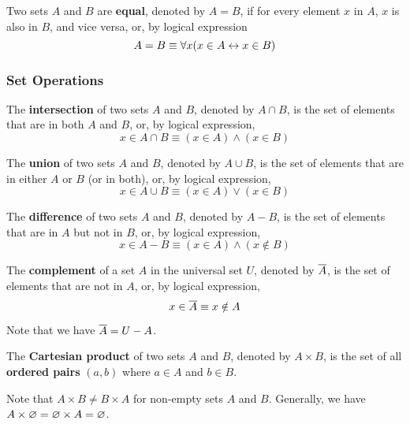 \begin{definition}
    Two sets $A$ and $B$ are \textbf{equal}, denoted by $A = B$, if for every element $x$ in $A$,
    $x$ is also in $B$, and vice versa, or, by logical expression
    \[
        A=B \equiv \forall x (x \in A \leftrightarrow x \in B)
    \]
\end{definition}

\subsubsection{Set Operations}

\begin{definition}
    The \textbf{intersection} of two sets $A$ and $B$, denoted by $A \cap B$,
    is the set of elements that are in both $A$ and $B$, or, by logical expression,
    \[
        x\in A\cap B \equiv (x \in A) \land (x \in B)
    \]
\end{definition}

\begin{definition}
    The \textbf{union} of two sets $A$ and $B$, denoted by $A \cup B$,
    is the set of elements that are in either $A$ or $B$ (or in both), or, by logical expression,
    \[
        x\in A\cup B \equiv (x \in A) \lor (x \in B)
    \]
\end{definition}

\begin{definition}[Difference $-$]
    The \textbf{difference} of two sets $A$ and $B$, denoted by $A - B$,
    is the set of elements that are in $A$ but not in $B$, or, by logical expression,
    \[
        x \in A - B \equiv (x \in A) \land (x \notin B)
    \]
\end{definition}

\begin{definition}
    The \textbf{complement} of a set $A$ in the universal set $U$, denoted by $\overline{A}$,
    is the set of elements that are not in $A$, or, by logical expression,
    \[
        x \in \overline{A} \equiv x \notin A
    \]
    
    Note that we have $\overline{A} = U - A$.
\end{definition}

\begin{definition}
    The \textbf{Cartesian product} of two sets $A$ and $B$, denoted by $A \times B$,
    is the set of all \textbf{ordered pairs} $(a, b)$ where $a \in A$ and $b \in B$.
\end{definition}

\begin{remark}
    Note that $A\times B\neq B\times A$ for non-empty sets $A$ and $B$.
    Generally, we have $A\times \varnothing = \varnothing\times A = \varnothing$.
\end{remark}